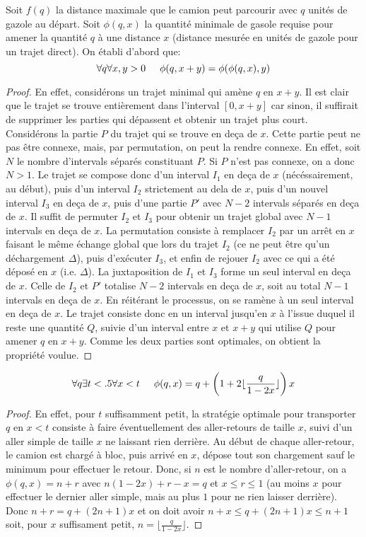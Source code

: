 \documentclass{article}
\begin{document}
Soit $f(q)$ la distance maximale que le camion peut parcourir avec $q$ unités de gazole au départ.
Soit $\phi(q,x)$ la quantité minimale de gasole requise pour amener la quantité $q$ à une distance $x$ (distance mesurée en unités de gazole pour un trajet direct). On établi d'abord que:
\[
\forall q\forall x,y>0\hspace{.5cm} \phi(q,x+y) = \phi(\phi(q,x),y)
\]
\begin{proof}
En effet, considérons un trajet minimal qui amène $q$ en $x+y$. Il est clair que le trajet se trouve entièrement dans l'interval $[0,x+y]$ car sinon, il suffirait de supprimer les parties qui dépassent et obtenir un trajet plus court. Considérons la partie $P$ du trajet qui se trouve en deça de $x$. Cette partie peut ne pas être connexe, mais, par permutation, on peut la rendre connexe. En effet, soit $N$ le nombre d'intervals séparés constituant $P$. Si $P$ n'est pas connexe, on a donc $N>1$. Le trajet se compose donc d'un interval $I_1$ en deça de $x$ (nécéssairement, au début), puis d'un interval $I_2$ strictement au dela de $x$, puis d'un nouvel interval $I_3$ en deça de $x$, puis d'une partie $P'$ avec $N-2$ intervals séparés en deça de $x$. Il suffit de permuter $I_2$ et $I_3$ pour obtenir un trajet global avec $N-1$ intervals en deça de $x$. La permutation consiste à remplacer $I_2$ par un arrêt en $x$ faisant le même échange global que lors du trajet $I_2$ (ce ne peut être qu'un déchargement $\Delta$), puis d'exécuter $I_3$, et enfin de rejouer $I_2$ avec ce qui a été déposé en $x$ (i.e. $\Delta$). La juxtaposition de $I_1$ et $I_3$ forme un seul interval en deça de $x$. Celle de $I_2$ et $P'$ totalise $N-2$ intervals en deça de $x$, soit au total $N-1$ intervals en deça de $x$. En réitérant le processus, on se ramène à un seul interval en deça de $x$. Le trajet consiste donc en un interval jusqu'en $x$ à l'issue duquel il reste une quantité $Q$, suivie d'un interval entre $x$ et $x+y$ qui utilise $Q$ pour amener $q$ en $x+y$. Comme les deux parties sont optimales, on obtient la propriété voulue.
\end{proof}
\[
\forall q\exists t<.5\forall x<t\hspace{.5cm} \phi(q,x) = q+\left(1+2\lfloor\frac{q}{1-2x}\rfloor\right)x
\]
\begin{proof}
En effet, pour $t$ suffisamment petit, la stratégie optimale pour transporter $q$ en $x<t$ consiste à faire éventuellement des aller-retours de taille $x$, suivi d'un aller simple de taille $x$ ne laissant rien derrière. Au début de chaque aller-retour, le camion est chargé à bloc, puis arrivé en $x$, dépose tout son chargement sauf le minimum pour effectuer le retour. Donc, si $n$ est le nombre d'aller-retour, on a $\phi(q,x)=n+r$ avec $n(1-2x)+r-x=q$ et $x\leq r\leq1$ (au moins $x$ pour effectuer le dernier aller simple, mais au plus $1$ pour ne rien laisser derrière). Donc $n+r=q+(2n+1)x$ et on doit avoir $n+x\leq q+(2n+1)x\leq n+1$ soit, pour $x$ suffisament petit, $n=\lfloor\frac{q}{1-2x}\rfloor$.
\end{proof}
\end{document}
